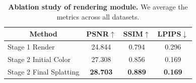 \begin{table}[t!]
\small
\centering
\begin{tabular}{l|ccc}
\toprule

\multicolumn{1}{c}{\multirow{1}[0]{*}{Method}} & PSNR$\uparrow$ & SSIM$\uparrow$ & LPIPS$\downarrow$ \\ \midrule

Stage 1 Render          & 24.844 & 0.794 & 0.296 \\
Stage 2 Initial Color          & 27.308 & 0.856 & 0.169 \\
Stage 2 Final Splatting         & \textbf{28.703} & \textbf{0.889} & \textbf{0.169} \\

\bottomrule
\end{tabular}
\caption{\textbf{Ablation study of rendering module.} We average the metrics across all datasets.}%
\label{tab:render}
\end{table}